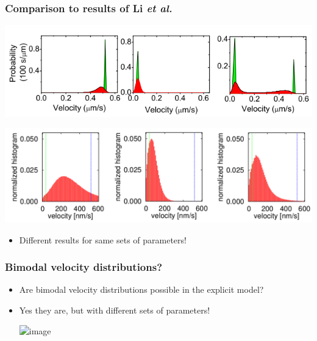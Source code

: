 \documentclass[11pt]{beamer}
\begin{document}
\begin{frame}
 \frametitle{Comparison to results of Li \textit{et al.}}
 \begin{center}
  \includegraphics[scale=0.55]{img/li-velocity-distribution.png}
 \end{center}
 \begin{center}
  \includegraphics[scale=0.35]{img/comp-li.png}
 \end{center} 
 \begin{itemize}
  \item
    Different results for same sets of parameters!
 \end{itemize}
\end{frame}

\begin{frame}
 \frametitle{Bimodal velocity distributions?}
 \begin{itemize}
  \item 
    Are bimodal velocity distributions possible in the explicit model?
    \pause
  \item
    Yes they are, but with different sets of parameters!
    \begin{center}
      \includegraphics<2->[scale=0.55]{img/bimodal-vel-dis.png}
    \end{center}
 \end{itemize}

\end{frame}
\end{document}
